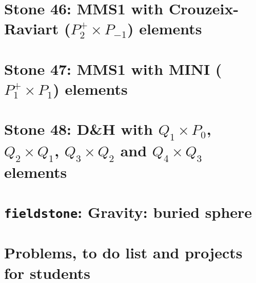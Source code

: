 \documentclass[a4paper]{article}
\begin{document}
\newpage %
\section*{
Stone 46: MMS1 with Crouzeix-Raviart ($P_2^+\times P_{-1}$) elements  
\label{f46}} 

\newpage %
\section*{
Stone 47: MMS1 with MINI ($P_1^+\times P_1$) elements
\label{f47}} 

\newpage %
\section*{
Stone 48: D\&H with $Q_1\times P_0$, $Q_2\times Q_1$, $Q_3\times Q_2$ and $Q_4\times Q_3$ elements
\label{f48}} 


\newpage %
\section{{\tt fieldstone}: Gravity: buried sphere} %

\newpage %
\section{Problems, to do list and projects for students} %
\end{document}
